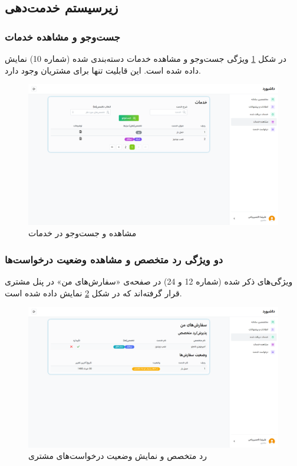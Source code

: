 \subsection{زیرسیستم خدمت‌دهی}

\subsubsection{جست‌وجو و مشاهده خدمات}

در شکل
\ref{ctmr-services}
ویژگی جست‌وجو و مشاهده خدمات دسته‌بندی شده (شماره 10) نمایش داده شده است. این قابلیت تنها برای مشتریان وجود دارد.

\begin{figure}[h]
	\centering
	\includegraphics[width=\textwidth]{figs/initial-ui/ctmr-services}
	\caption{مشاهده و جست‌وجو در خدمات}
	\label{ctmr-services}
\end{figure}

\subsubsection{دو ویژگی رد متخصص و مشاهده وضعیت درخواست‌ها}
ویژگی‌های ذکر شده (شماره 12 و 24) در صفحه‌ی «سفارش‌های من» در پنل مشتری قرار گرفته‌اند که در شکل
\ref{ctmr-requests-spec}
نمایش داده شده است.

\begin{figure}[h]
	\centering
	\includegraphics[width=\textwidth]{figs/initial-ui/ctmr-requests-spec}
	\caption{رد متخصص و نمایش وضعیت درخواست‌های مشتری}
	\label{ctmr-requests-spec}
\end{figure}


